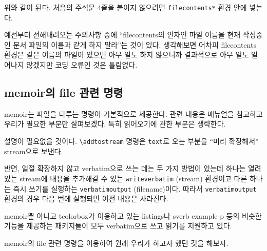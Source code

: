 
위와 같이 된다. 처음의 주석문 4줄을 붙이지 않으려면 \verb|filecontents*| 환경 안에 넣는다.

예전부터 전해내려오는 주의사항 중에 “filecontents의 인자인 파일 이름을 현재 작성중인 문서 파일의 이름과 같게 하지 말라”는 것이 있다. 생각해보면 어차피 filecontents 환경은 같은 이름의 파일이 있으면 아무 일도 
하지 않으니까 결과적으로 아무 일도 일어나지 않겠지만 코딩 오류인 것은 틀림없다.



\subsection{memoir의 file 관련 명령}

memoir는 파일을 다루는 명령이 기본적으로 제공한다. 관련 내용은 매뉴얼을 참고하고 우리가 필요한 부분만
살펴보겠다. 특히 읽어오기에 관한 부분은 생략한다.

\begin{exampleonly}
\end{exampleonly}

설명이 필요없을 것이다. \verb|\addtostream| 명령은 \texttt{text}로 오는 부분을 “미리 확장해서”
stream으로 보낸다.

\begin{examplebelow}
\def\myname{Nova de Hi.}
\addtostream{outputone}{\myname}



\fbox{}
\end{examplebelow}

반면, 일절 확장하지 않고 verbatim으로 쓰는 데는 두 가지 방법이 있는데 하나는 열려 있는 stream에
내용을 추가해갈 수 있는 \verb|writeverbatim| (stream) 환경이고 다른 하나는 즉시 쓰기를 실행하는
\verb|verbatimoutput| (filename)이다. 따라서 \verb|verbatimoutput| 환경의 경우 다음 번에 실행되면
이전 내용은 사라진다.

memoir뿐 아니고 \textsf{tcolorbox}가 이용하고 있는 \textsf{listings}나 \textsf{sverb}
\textsf{example-p} 등의 비슷한 기능을 제공하는 패키지들이 모두 verbatim으로 쓰고 읽기를
지원하고 있다.

memoir의 file 관련 명령을 이용하여 원래 우리가 하고자 했던 것을 해보자.

